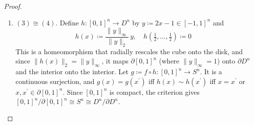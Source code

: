 \begin{proof}
\begin{enumerate}
			\item $(3) \cong (4)$. Define $h: [0, 1]^n \rightarrow D^n$ by $y \coloneqq 2x - 1 \in [-1, 1]^n$ and 
				\begin{equation}
					h(x) \coloneqq \frac{\|y\|_\infty}{\|y\|_2} \, y, \quad h(\tfrac{1}{2}, \ldots, \tfrac{1}{2}) \coloneqq 0
				\end{equation}
				This is a homeomorphism that radially rescales the cube onto the disk, and since $\|h(x)\|_2 = \|y\|_\infty$, it maps $\partial [0, 1]^n$ (where $\|y\|_\infty = 1$) onto $\partial D^n$ and the interior onto the interior. Let $g \coloneqq f \circ h : [0, 1]^n \rightarrow S^n$. It is a continuous surjection, and $g(x) = g(x^\prime)$ iff $h(x) \sim h(x^\prime)$ iff $x = x^\prime$ or $x, x^\prime \in \partial [0, 1]^n$. Since $[0, 1]^n$ is compact, the criterion gives $[0, 1]^n / \partial [0, 1]^n \cong S^n \cong D^n / \partial D^n$. 
		\end{enumerate}
	\end{proof}

